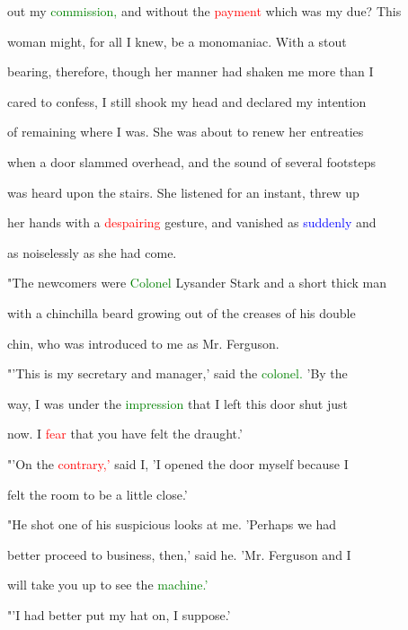  out my \textcolor{green}{commission,} and without the \textcolor{red}{payment} which was my due? This

 woman might, for all I knew, be a monomaniac. With a stout

 bearing, therefore, though her manner had shaken me more than I

 cared to \textcolor{BurntOrange}{confess,} I still shook my head and declared my intention

 of remaining where I was. She was about to renew her entreaties

 when a door \textcolor{BurntOrange}{slammed} overhead, and the sound of several footsteps

 was heard upon the stairs. She listened for an instant, threw up

 her hands with a \textcolor{red}{despairing} gesture, and \textcolor{BurntOrange}{vanished} as \textcolor{blue}{suddenly} and

 as noiselessly as she had come.



 "The \textcolor{BurntOrange}{newcomers} were \textcolor{green}{Colonel} Lysander \textcolor{BurntOrange}{Stark} and a short thick man

 with a chinchilla beard \textcolor{BurntOrange}{growing} out of the creases of his double

 chin, who was introduced to me as Mr. Ferguson.



 "'This is my secretary and manager,' said the \textcolor{green}{colonel.} 'By the

 way, I was under the \textcolor{green}{impression} that I left this door shut just

 now. I \textcolor{red}{fear} that you have felt the draught.'



 "'On the \textcolor{red}{contrary,'} said I, 'I opened the door myself because I

 felt the room to be a little close.'



 "He \textcolor{BurntOrange}{shot} one of his \textcolor{BurntOrange}{suspicious} looks at me. 'Perhaps we had

 better proceed to business, then,' said he. 'Mr. Ferguson and I

 will take you up to see the \textcolor{green}{machine.'}



 "'I had better put my hat on, I suppose.'




